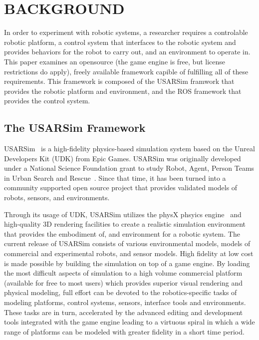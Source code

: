 \section*{BACKGROUND}
In order to experiment with robotic systems, a researcher requires a controlable robotic platform, a control system that interfaces to the robotic system and provides behaviors for the robot to carry out, and an environment to operate in.  This paper examines an opensource (the game engine is free, but license restrictions do apply), freely available framework capible of fulfilling all of these requirements. This framework is composed of the USARSim framwork that provides the robotic platform and environment, and the ROS framework that provides the control system.

\subsection*{The USARSim Framework}
USARSim~\cite{CARPIN.LNAI.2006,WANG.WSC.2003} is a high-fidelity physics-based simulation system based on the Unreal Developers Kit (UDK)\cite{UDKWeb} from Epic Games. USARSim was originally developed under a National Science Foundation grant to study Robot, Agent, Person Teams in Urban Search and Rescue~\cite{LEWIS.ICHC.2003}. Since that time, it has been turned into a community supported open source project that provides validated models of robots, sensors, and environments.  


Through its usage of UDK, USARSim utilizes the physX phsyics engine~\cite{physXWeb} and high-quality 3D rendering facilities to create a realistic simulation environment that provides the embodiment of, and environment for a robotic
system. The current release of USARSim consists of various environmental models, models of commercial and experimental robots, and sensor models. High fidelity at low cost is made possible by building the simulation on top of a game engine. By loading the most
difficult aspects of simulation to a high volume commercial platform (available for free to most users) which provides superior visual rendering and physical modeling, full effort can be devoted to the robotics-specific tasks of modeling platforms, control systems, sensors, interface tools and environments. These tasks are in turn, accelerated by the advanced editing and development tools integrated with the game engine leading to a virtuous spiral in which a wide range of platforms can be modeled with greater fidelity in a short time period.

